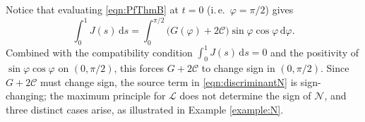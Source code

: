 \documentclass{amsart}
\newtheorem{remark}{Remark}[section]
\newcommand{\Be}{{\boldsymbol{e}}}
\newcommand{\BF}{{\boldsymbol{F}}}
\newcommand{\mcC}{\mathcal{C}}
\begin{document}




Notice that evaluating \eqref{eqn:PfThmB} at $t=0$ (i.\,e.\ $\varphi=\pi/2$) gives
\[
\int_{0}^{1} J(s)\,\mathrm{d}s = \int_{0}^{\pi/2} \bigl(G(\varphi)+2\mathcal{C}\bigr)\sin\varphi\cos\varphi\,\mathrm{d}\varphi .
\]
Combined with the compatibility condition $\int_{0}^{1} J(s)\,\mathrm{d}s = 0$ and the positivity of
$\sin\varphi\cos\varphi$ on $(0,\pi/2)$, this forces $G+2\mcC$ to change sign in $(0,\pi/2)$.  Since $G+2\mathcal{C}$ must change sign, the source term in \eqref{eqn:discriminantN} is sign-changing; the maximum principle for $\mathcal{L}$ does not determine the sign of $\mathcal{N}$, and three distinct cases arise, as illustrated in Example \ref{example:N}.
\end{document}
